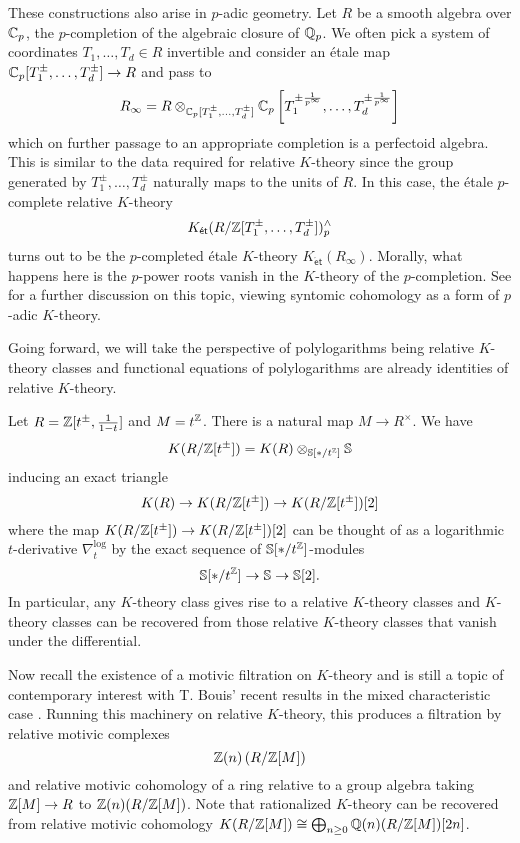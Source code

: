 These constructions also arise in $p$-adic geometry. Let $R$ be a smooth algebra over $\mathbb{C}_{p}$, the $p$-completion of the algebraic closure of $\mathbb{Q}_{p}$. We often pick a system of coordinates $T_{1},\dots,T_{d}\in R$ invertible and consider an \'{e}tale map $\mathbb{C}_{p}[T_{1}^{\pm},\dots,T_{d}^{\pm}]\to R$ and pass to
$$R_{\infty}=R\otimes_{\mathbb{C}_{p}[T_{1}^{\pm},\dots,T_{d}^{\pm}]}\mathbb{C}_{p}\left[T_{1}^{\pm\frac{1}{p^{\infty}}},\dots,T_{d}^{\pm\frac{1}{p^{\infty}}}\right]$$
which on further passage to an appropriate completion is a perfectoid algebra. This is similar to the data required for relative $K$-theory since the group generated by $T_{1}^{\pm},\dots,T_{d}^{\pm}$ naturally maps to the units of $R$. In this case, the \'{e}tale $p$-complete relative $K$-theory 
$$K_{\mathsf{\acute{e}t}}(R/\mathbb{Z}[T_{1}^{\pm},\dots,T_{d}^{\pm}])^{\wedge}_{p}$$
turns out to be the $p$-completed \'{e}tale $K$-theory $K_{\mathsf{\acute{e}t}}(R_{\infty})$. Morally, what happens here is the $p$-power roots vanish in the $K$-theory of the $p$-completion. See \cite{PrismaticCohDelta} for a further discussion on this topic, viewing syntomic cohomology as a form of $p$-adic $K$-theory. 

Going forward, we will take the perspective of polylogarithms being relative $K$-theory classes and functional equations of polylogarithms are already identities of relative $K$-theory. 

\begin{example}
    Let $R=\mathbb{Z}[t^{\pm},\frac{1}{1-t}]$ and $M=t^{\mathbb{Z}}$. There is a natural map $M\to R^{\times}$. We have 
    $$K(R/\mathbb{Z}[t^{\pm}])=K(R)\otimes_{\mathbb{S}[*/t^{\mathbb{Z}}]}\mathbb{S}$$
    inducing an exact triangle 
    $$K(R)\to K(R/\mathbb{Z}[t^{\pm}])\to K(R/\mathbb{Z}[t^{\pm}])[2]$$
    where the map $K(R/\mathbb{Z}[t^{\pm}])\to K(R/\mathbb{Z}[t^{\pm}])[2]$ can be thought of as a logarithmic $t$-derivative $\nabla^{\log}_{t}$ by the exact sequence of $\mathbb{S}[*/t^{\mathbb{Z}}]$-modules
    $$\mathbb{S}[*/t^{\mathbb{Z}}]\to\mathbb{S}\to\mathbb{S}[2].$$
    In particular, any $K$-theory class gives rise to a relative $K$-theory classes and $K$-theory classes can be recovered from those relative $K$-theory classes that vanish under the differential. 
\end{example}

Now recall the existence of a motivic filtration on $K$-theory \cite{MotivicFiltrationKTheory} and is still a topic of contemporary interest with T. Bouis' recent results in the mixed characteristic case \cite{BouisThesis}. Running this machinery on relative $K$-theory, this produces a filtration by relative motivic complexes 
$$\mathbb{Z}(n)\left(R/\mathbb{Z}[M]\right)$$
and relative motivic cohomology of a ring relative to a group algebra taking $\mathbb{Z}[M]\to R$ to $\mathbb{Z}(n)(R/\mathbb{Z}[M])$. Note that rationalized $K$-theory can be recovered from relative motivic cohomology $K(R/\mathbb{Z}[M])\cong\bigoplus_{n\geq0}\mathbb{Q}(n)(R/\mathbb{Z}[M])[2n]$.

